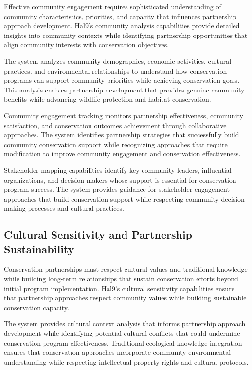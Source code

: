 \documentclass[
  Letterpaper,
]{scrbook}
\begin{document}
Effective community engagement requires sophisticated understanding of
community characteristics, priorities, and capacity that influences
partnership approach development. Hal9's community analysis capabilities
provide detailed insights into community contexts while identifying
partnership opportunities that align community interests with
conservation objectives.

The system analyzes community demographics, economic activities,
cultural practices, and environmental relationships to understand how
conservation programs can support community priorities while achieving
conservation goals. This analysis enables partnership development that
provides genuine community benefits while advancing wildlife protection
and habitat conservation.

Community engagement tracking monitors partnership effectiveness,
community satisfaction, and conservation outcomes achievement through
collaborative approaches. The system identifies partnership strategies
that successfully build community conservation support while recognizing
approaches that require modification to improve community engagement and
conservation effectiveness.

Stakeholder mapping capabilities identify key community leaders,
influential organizations, and decision-makers whose support is
essential for conservation program success. The system provides guidance
for stakeholder engagement approaches that build conservation support
while respecting community decision-making processes and cultural
practices.

\subsection{Cultural Sensitivity and Partnership
Sustainability}\label{cultural-sensitivity-and-partnership-sustainability}

Conservation partnerships must respect cultural values and traditional
knowledge while building long-term relationships that sustain
conservation efforts beyond initial program implementation. Hal9's
cultural sensitivity capabilities ensure that partnership approaches
respect community values while building sustainable conservation
capacity.

The system provides cultural context analysis that informs partnership
approach development while identifying potential cultural conflicts that
could undermine conservation program effectiveness. Traditional
ecological knowledge integration ensures that conservation approaches
incorporate community environmental understanding while respecting
intellectual property rights and cultural protocols.
\end{document}
